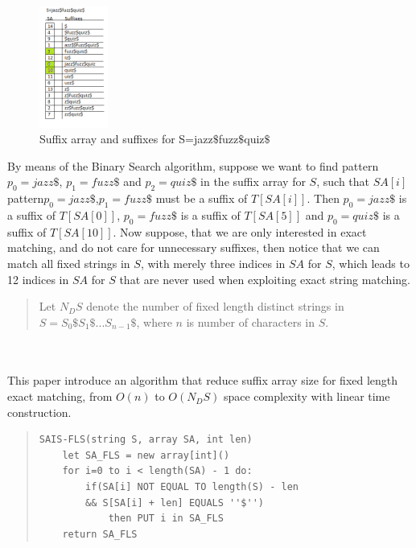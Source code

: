 \documentclass[12pt]{article} %
\begin{document}
\begin{figure}[H]
    \centering
    \includegraphics[width=0.2\textwidth]{jazz}
    \captionsetup{width=0.8
    \textwidth}
    \caption{Suffix array and suffixes for S=jazz$\$$fuzz$\$$quiz$\$$}
    \label{fig:jazz}
\end{figure}

By means of the Binary Search algorithm, suppose we want to find pattern $p_0=jazz\$$, $ p_1=fuzz\$$ and $p_2=quiz\$$ in the suffix array for $S$, such that $SA[i]$ pattern$ p_0=jazz\$$,$ p_1=fuzz\$$ must be a suffix of $T[SA[i]]$. Then $p_0=jazz\$$ is a suffix of $T[SA[0]]$, $p_0=fuzz\$$ is a suffix of $T[SA[5]]$ and $p_0=quiz\$$ is a suffix of $T[SA[10]]$. Now suppose, that we are only interested in exact matching, and do not care for unnecessary suffixes, then notice that we can match all fixed strings in $S$, with merely three indices in $SA$ for $S$, which leads to 12 indices in $SA$ for $S$ that are never used when exploiting exact string matching. 
\\
\begin{quote}
Let $N_DS$ denote the number of fixed length distinct strings in $S=S_0\$S_1\$...S_{n-1}\$ $, where $n$ is number of characters in $S$.
\end{quote}
\\ \\
This paper introduce an algorithm that reduce suffix array size for fixed length exact matching, from $O(n)$ to $O(N_DS)$ space complexity with linear time construction. 

\begin{quote}
\begin{lstlisting}
SAIS-FLS(string S, array SA, int len)
	let SA_FLS = new array[int]()
	for i=0 to i < length(SA) - 1 do:
		if(SA[i] NOT EQUAL TO length(S) - len
		&& S[SA[i] + len] EQUALS ''$'') 
			then PUT i in SA_FLS
	return SA_FLS
\end{lstlisting}
\end{quote}
\end{document}
